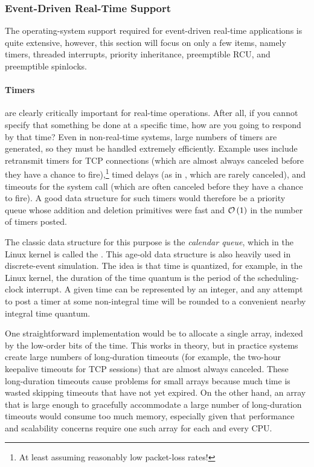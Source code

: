 \subsubsection{Event-Driven Real-Time Support}
\label{sec:advsync:Event-Driven Real-Time Support}

The operating-system support required for event-driven real-time
applications is quite extensive, however, this section will focus
on only a few items, namely
timers,
threaded interrupts,
priority inheritance,
preemptible RCU,
and
preemptible spinlocks.

\paragraph{Timers} are clearly critically important for real-time
operations.
After all, if you cannot specify that something be done at a specific
time, how are you going to respond by that time?
Even in non-real-time systems, large numbers of timers are generated,
so they must be handled extremely efficiently.
Example uses include retransmit timers for TCP connections (which are
almost always canceled before they have a chance to fire),\footnote{
	At least assuming reasonably low packet-loss rates!}
timed delays (as in , which are rarely canceled),
and timeouts for the  system call (which are often
canceled before they have a chance to fire).
A good data structure for such timers would therefore be a priority queue
whose addition and deletion primitives were fast and $\mathcal{O}\left(1\right)$ in the number
of timers posted.

The classic data structure for this purpose is the \emph{calendar queue},
which in the Linux kernel is called the .
This age-old data structure is also heavily used in discrete-event
simulation.
The idea is that time is quantized, for example, in the Linux kernel,
the duration of the time quantum is the period of the scheduling-clock
interrupt.
A given time can be represented by an integer, and any attempt to post
a timer at some non-integral time will be rounded to a convenient nearby
integral time quantum.

One straightforward implementation would be to allocate a single array,
indexed by the low-order bits of the time.
This works in theory, but in practice systems create large numbers of
long-duration timeouts (for example, the two-hour keepalive timeouts for TCP
sessions) that are almost always canceled.
These long-duration timeouts cause problems for small arrays because
much time is wasted skipping timeouts that have not yet expired.
On the other hand, an array that is large enough to gracefully accommodate
a large number of long-duration timeouts would consume too much memory,
especially given that performance and scalability concerns require one
such array for each and every CPU\@.

